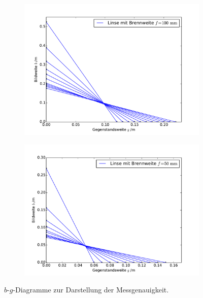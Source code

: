 \begin{figure}[hb] %
	\centering
	\begin{subfigure}{0.9\textwidth}
	\includegraphics[width=\textwidth]{Bilder/Messung1.pdf}
	\end{subfigure}
	\begin{subfigure}{0.9\textwidth}
	\includegraphics[width=\textwidth]{Bilder/Messung2.pdf}
	\end{subfigure}
	\caption{$b$-$g$-Diagramme zur Darstellung der Messgenauigkeit. \cite{matplotlib}}
	\label{fig:bgdiagramm} 
\end{figure}
\newpage
